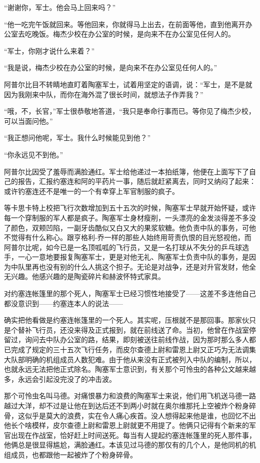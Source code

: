     “谢谢你，军士。他会马上回来吗？”

    “他一吃完午饭就回来。等他回来，你就得马上出去，在前面等他，直到他离开办公室去吃晚饭。梅杰少校在办公室的时候，是向来不在办公室见任何人的。

    “军士，你刚才说什么来着？”

    “我是说，梅杰少校在办公室的时候，是向来不在办公室见任何人的。”

    阿普尔比目不转睛地直盯着陶塞军士，试着用坚定的语调，说：“军士，是不是就因为我刚来中队，而你在海外混了很长时间，就想法子作弄我？”

    “哦，不，长官，”军士很恭敬地答道，“我只是奉命行事而已。等你见了梅杰少校，可以当面问他。”

    “我正想问他呢，军士。我什么时候能见到他？”

    “你永远见不到他。”

    阿普尔比因受了羞辱而满脸通红。军士给他递过一本拍纸簿，他便在上面写下了自己的报告，汇报约塞连和阿的平药片一事，随后就赶紧离去，同时又纳闷了起来：或许钓塞连还不是唯一的一个有幸穿上军官制服的疯子。

    等卡思卡特上校把飞行次数增加到五十五次的时候，陶塞军士早就开始怀疑，或许每一个穿制服的军人都是疯子。陶塞军士身材瘦削，一头漂亮的金发淡得差不多没了颜色，双颊凹陷，一副牙齿酷似又白又大的果浆软糖。他负责中队的事务，可他不觉得有什么称心。跟亨格利-乔一样的那些人始终用苛责仇恨的目光怒视他，而阿普尔比呢，如今已是一名顶呱呱的飞行员，又是一名打球从不失分的乒乓球选手，一心一意地要报复陶塞军士，更是对他无礼、陶塞军士负责中队的事务，是因为中队里再也没有别的什么人挑这个担子。无论是对战争，还是对升官发财，他全无兴趣。他感兴趣的是陶瓷碎片和赫波怀特式家具。

 


    对约塞连帐篷里的那个死人，陶塞军士已经习惯性地接受了——这差不多连他自己都没意识到——约塞连本人的说法——

    确实把他看做是约塞连帐篷里的一个死人。其实呢，压根就不是那回事。那家伙只是个替补飞行员，还没来得及正式报到，就在前线送了命。当初，他曾在作战室停留过，询问去中队办公室的路，结果，即刻被送往前线作战，因为那时那么多人都已完成了规定的三十五次飞行任务，而皮尔查德上尉和雷恩上尉又正巧为无法调集大队部明确的机组成员人数犯难。由于他从来没有正式被列入中队的编制，所以，也就永远无法把他正式除名。陶塞军士意识到，有关那个可怜虫的各种公文越来越多，永远会引起没完没了的冲击波。

    那个可怜虫名叫马德。对痛恨暴力和浪费的陶塞军士来说，他们用飞机送马德一路越过大洋，却不过是让他在到达后还不到两小时就在奥尔维那托上空被炸个粉身碎骨，这似乎是莫大的浪费，实在令人痛心疾首。没人想得起来他是谁，也回忆不出他长个啥模样，皮尔查德上尉和雷恩上尉就更不用提了。他俩只记得有个新来的军官出现在作战室，恰好赶上时间送死。每当有人提起约塞连帐篷里的死人那件事，他俩总是很显得尴尬，满脸通红。本该见过马德的那仅有的几个人，是他同机的机组成员，也都跟他一起被炸了个粉身碎骨。


